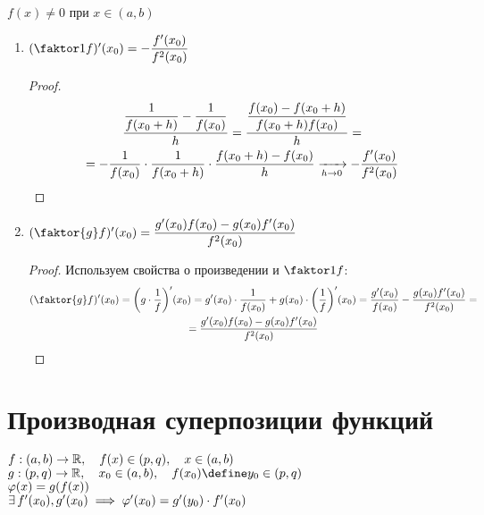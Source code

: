 \begin{properties}
	$f(x) \ne 0$ при $x \in (a, b)$
	\begin{enumerate}
		\item $(\faktor1f)'(x_0) = - \dfrac{f'(x_0)}{f^2(x_0)}$
		\begin{proof}
			\begin{multline*}
				\frac{\dfrac1{f(x_0 + h)} - \dfrac1{f(x_0)}}h = \frac{\dfrac{f(x_0) - f(x_0 + h)}{f(x_0 + h)f(x_0)}}h = \\ = - \frac1{f(x_0)} \cdot \frac1{f(x_0 + h)} \cdot \frac{f(x_0 + h) - f(x_0)}h \xrightarrow[h \to 0]{} -\frac{f'(x_0)}{f^2(x_0)}
			\end{multline*}
		\end{proof}
		\item $(\faktor{g}f)'(x_0) = \dfrac{g'(x_0)f(x_0) - g(x_0)f'(x_0)}{f^2(x_0)}$
		\begin{proof}
			Используем свойства о произведении и $\faktor1f$:
			\begin{multline*}
				(\faktor{g}f)'(x_0) = \bigg( g \cdot \frac1f \bigg)'(x_0) = g'(x_0) \cdot \frac1{f(x_0)} + g(x_0) \cdot \bigg(\frac1f \bigg)'(x_0) = \frac{g'(x_0)}{f(x_0)} - \frac{g(x_0)f'(x_0)}{f^2(x_0)} = \\ = \frac{g'(x_0)f(x_0) - g(x_0)f'(x_0)}{f^2(x_0)}
			\end{multline*}
		\end{proof}
	\end{enumerate}
\end{properties}

\section{Производная суперпозиции функций}

\begin{property}
	$f : (a, b) \to \mathbb{R}, \quad f(x) \in (p, q), \quad x \in (a, b)$ \\
	$g : (p, q) \to \R, \quad x_0 \in (a, b), \quad f(x_0) \define y_0 \in (p, q)$ \\
	$ \varphi(x) = g(f(x))$ \\
	$ \exists\, f'(x_0), g'(x_0) \implies \varphi'(x_0) = g'(y_0) \cdot f'(x_0) $
\end{property}

